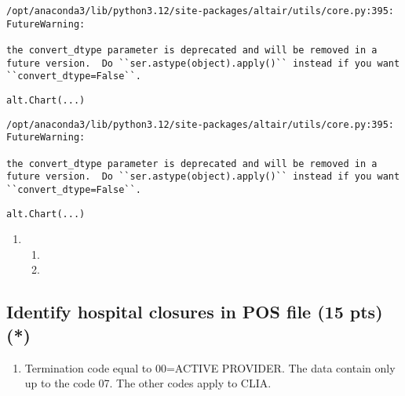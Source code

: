 \documentclass[
  letterpaper,
  DIV=11,
  numbers=noendperiod]{scrartcl}
\providecommand{\tightlist}{%
  \setlength{\itemsep}{0pt}\setlength{\parskip}{0pt}}\usepackage{longtable,booktabs,array}
\begin{document}
\begin{verbatim}
/opt/anaconda3/lib/python3.12/site-packages/altair/utils/core.py:395: FutureWarning:

the convert_dtype parameter is deprecated and will be removed in a future version.  Do ``ser.astype(object).apply()`` instead if you want ``convert_dtype=False``.
\end{verbatim}

\begin{verbatim}
alt.Chart(...)
\end{verbatim}

\begin{verbatim}
/opt/anaconda3/lib/python3.12/site-packages/altair/utils/core.py:395: FutureWarning:

the convert_dtype parameter is deprecated and will be removed in a future version.  Do ``ser.astype(object).apply()`` instead if you want ``convert_dtype=False``.
\end{verbatim}

\begin{verbatim}
alt.Chart(...)
\end{verbatim}

\begin{enumerate}
\def\labelenumi{\arabic{enumi}.}
\setcounter{enumi}{3}
\tightlist
\item
  \begin{enumerate}
  \def\labelenumii{\alph{enumii}.}
  \tightlist
  \item
  \item
  \end{enumerate}
\end{enumerate}

\subsection{Identify hospital closures in POS file (15 pts)
(*)}\label{identify-hospital-closures-in-pos-file-15-pts}

\begin{enumerate}
\def\labelenumi{\arabic{enumi}.}
\tightlist
\item
  Termination code equal to 00=ACTIVE PROVIDER. The data contain only up
  to the code 07. The other codes apply to CLIA.
\end{enumerate}
\end{document}
